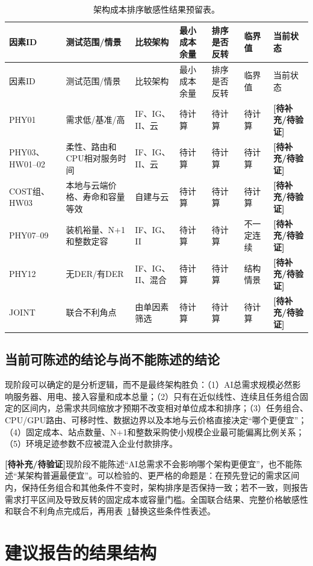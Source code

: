 \documentclass[preprint]{elsarticle}
\newcommand{\pending}{\textcolor{red!70!black}{\textbf{[待补充/待验证]}}}
\begin{document}
\small
\begin{longtable}{p{1.5cm}p{2.5cm}p{2.1cm}p{2.0cm}p{1.8cm}p{1.5cm}p{1.7cm}}
 \caption{架构成本排序敏感性结果预留表。}\label{tab:sensitivity-ranking-placeholder}\\
 \toprule
 因素ID & 测试范围/情景 & 比较架构 & 最小成本余量 & 排序是否反转 & 临界值 & 当前状态 \\
 \midrule
 \endfirsthead
 \toprule
 因素ID & 测试范围/情景 & 比较架构 & 最小成本余量 & 排序是否反转 & 临界值 & 当前状态 \\
 \midrule
 \endhead
 PHY01 & 需求低/基准/高 & IF、IG、II、云 & 待计算 & 待计算 & 待计算 & \pending \\
 PHY03、HW01--02 & 柔性、路由和CPU相对服务时间 & IF、IG、II、云 & 待计算 & 待计算 & 待计算 & \pending \\
 COST组、HW03 & 本地与云端价格、寿命和容量等效 & 自建与云 & 待计算 & 待计算 & 待计算 & \pending \\
 PHY07--09 & 装机裕量、N+1和整数定容 & IF、IG、II & 待计算 & 待计算 & 不一定连续 & \pending \\
 PHY12 & 无DER/有DER & IF、IG、II、混合 & 待计算 & 待计算 & 结构情景 & \pending \\
 JOINT & 联合不利角点 & 由单因素筛选 & 待计算 & 待计算 & 待计算 & \pending \\
 \bottomrule
\end{longtable}
\normalsize

\subsection{当前可陈述的结论与尚不能陈述的结论}

现阶段可以确定的是分析逻辑，而不是最终架构胜负：（1）AI总需求规模必然影响服务器、用电、接入容量和成本总量；（2）只有在近似线性、连续且任务组合固定的区间内，总需求共同缩放才预期不改变相对单位成本和排序；（3）任务组合、CPU/GPU路由、可移时性、数据边界以及本地与云价格直接决定“哪个更便宜”；（4）固定成本、站点数量、N+1和整数采购使小规模企业最可能偏离比例关系；（5）环境足迹参数不应被混入企业付款排序。

\pending 现阶段不能陈述“AI总需求不会影响哪个架构更便宜”，也不能陈述“某架构普遍最便宜”。可以检验的、更严格的命题是：在预先登记的需求区间内，保持任务组合和其他条件不变时，架构排序是否保持一致；若不一致，则报告需求打平区间及导致反转的固定成本或容量门槛。全国联合结果、完整价格敏感性和联合不利角点完成后，再用表~\ref{tab:sensitivity-ranking-placeholder}替换这些条件性表述。

\section{建议报告的结果结构}
\end{document}
